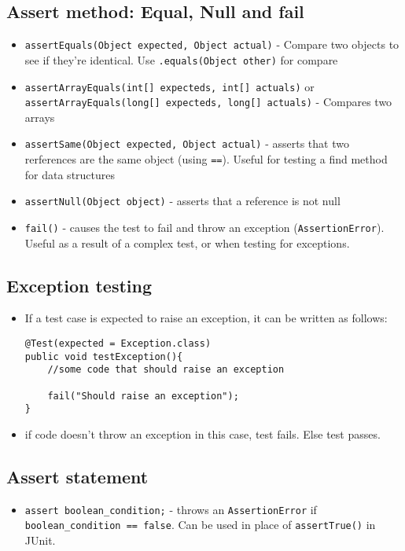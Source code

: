\documentclass[12pt]{book}
\begin{document}
\subsection*{Assert method: Equal, Null and fail}

\begin{itemize}
    \item \texttt{assertEquals(Object expected, Object actual)} - Compare two objects to see if they're identical. Use \texttt{.equals(Object other)} for compare
    \item \texttt{assertArrayEquals(int[] expecteds, int[] actuals)} or \texttt{assertArrayEquals(long[] expecteds, long[] actuals)} - Compares two arrays
    \item \texttt{assertSame(Object expected, Object actual)} - asserts that two rerferences are the same object (using \texttt{==}). Useful for testing a find method for data structures
    \item \texttt{assertNull(Object object)} - asserts that a reference is not null
    \item \texttt{fail()} - causes the test to fail and throw an exception (\texttt{AssertionError}). Useful as a result of a complex test, or when testing for exceptions.
\end{itemize}

\subsection*{Exception testing}

\begin{itemize}
    \item If a test case is expected to raise an exception, it can be written as follows:
\begin{lstlisting}
@Test(expected = Exception.class)
public void testException(){
    //some code that should raise an exception

    fail("Should raise an exception");
}
\end{lstlisting}

    \item if code doesn't throw an exception in this case, test fails. Else test passes.
\end{itemize}

\subsection*{Assert statement}

\begin{itemize}
    \item \texttt{assert boolean\_condition;} - throws an \texttt{AssertionError} if \texttt{boolean\_condition == false}. Can be used in place of \texttt{assertTrue()} in JUnit.
\end{itemize}
\end{document}
